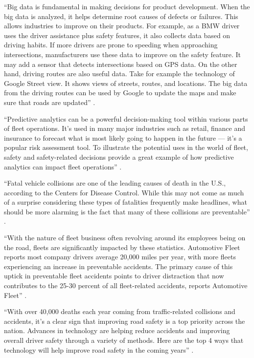 ``Big data is fundamental in making decisions for product development. When the big data is analyzed, it helps determine root causes of defects or failures. This allows industries to improve on their products. For example, as a BMW driver uses the driver assistance plus safety features, it also collects data based on driving habits. If more drivers are prone to speeding when approaching intersections, manufacturers use these data to improve on the safety feature. It may add a sensor that detects intersections based on GPS data. On the other hand, driving routes are also useful data. Take for example the technology of Google Street view. It shows views of streets, routes, and locations. The big data from the driving routes can be used by Google to update the maps and make sure that roads are updated'' \cite{Walker2017safety}.

``Predictive analytics can be a powerful decision-making tool within various parts of fleet operations. It’s used in many major industries such as retail, finance and insurance to forecast what is most likely going to happen in the future — it’s a popular risk assessment tool. To illustrate the potential uses in the world of fleet, safety and safety-related decisions provide a great example of how predictive analytics can impact fleet operations'' \cite{Suizo2015decisions}.

``Fatal vehicle collisions are one of the leading causes of death in the U.S., according to the Centers for Disease Control. While this may not come as much of a surprise considering these types of fatalities frequently make headlines, what should be more alarming is the fact that many of these collisions are preventable'' \cite{Suizo2015decisions}.

``With the nature of fleet business often revolving around its employees being on the road, fleets are significantly impacted by these statistics. Automotive Fleet reports most company drivers average 20,000 miles per year, with more fleets experiencing an increase in preventable accidents. The primary cause of this uptick in preventable fleet accidents points to driver distraction that now contributes to the 25-30 percent of all fleet-related accidents, reports Automotive Fleet'' \cite{Suizo2015decisions}.

``With over 40,000 deaths each year coming from traffic-related collisions and accidents, it's a clear sign that improving road safety is a top priority across the nation. Advances in technology are helping reduce accidents and improving overall driver safety through a variety of methods. Here are the top 4 ways that technology will help improve road safety in the coming years'' \cite{Mills2017safety}.

